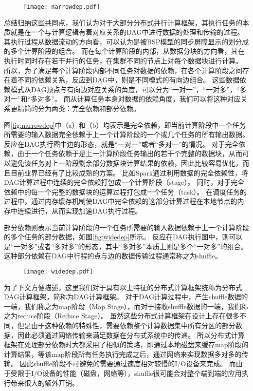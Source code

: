 \begin{figure}[!htp]
    \centering
    \texttt{[image: narrowdep.pdf]}
\end{figure}

总结归纳这些共同点，我们认为对于大部分分布式并行计算框架，其执行任务的本质就是在一个与计算逻辑有着对应关系的DAG中进行数据的处理和传输的过程。
其执行过程从数据流动的方向看，可以认为是被BSP模型的同步屏障显示的划分成的多个计算阶段的组合。
而在每个计算阶段的内部，从数据分块的方向看，其在执行时同时存在若干并行的任务，在集群不同的节点上对每个数据块进行计算。
所以，为了满足每个计算阶段内部不同任务对数据的依赖，在各个计算阶段之间存在着不同的依赖关系，反应到DAG中，则是不同模式的有向边组合。
这些数据依赖模式从DAG顶点与有向边对应关系的角度，可以分为“一对一”，“一对多”，“多对一”和“多对多”。
而从计算任务本身对数据的依赖角度，我们可以将这种对应关系更精简的分为两类：完全依赖和部分依赖。

图\ref{fig:narrowdep}中（a）和（b）均表示是完全依赖，即当前计算阶段中一个任务所需要的输入数据完全依赖于上一个计算阶段的一个或几个任务的所有输出数据。
反应在DAG执行图中边的形态，就是“一对一”或者“多对一”的情况。
对于完全依赖，由于一个任务依赖于是上一计算阶段任务输出的若干个完整的数据块，从而可以避免该任务对上一阶段剩余部分数据块计算结果的依赖，因此比较容易优化，而且目前业界已经有了比较成熟的方案。
比如Spark通过利用数据的完全依赖性，将DAG计算过程中连续的完全依赖打包成一个计算阶段（stage）。
同时，对于完全依赖中的每一个完整的数据块的运算过程打包成一个任务（task）。
在调度任务的过程中，通过内存缓存机制使DAG中完全依赖的这部分计算过程在本地节点的内存中连续进行，从而实现加速DAG执行过程。

部分依赖则表示当前计算阶段的一个任务所需要的输入数据依赖于上一个计算阶段的多个任务的部分数据，如图\ref{fig:widedep}所示。
反应在DAG执行图中，则可以是“一对多”或者“多对多”的形态，其中“多对多”本质上则是多个“一对多”的组合。
这种部分依赖在DAG中行程的点与边的数据传输过程通常称之为shuffle。

\begin{figure}[!htp]
    \centering
    \texttt{[image: widedep.pdf]}
\end{figure}

为了下文方便描述，这里我们对于具有以上特征的分布式计算框架统称为分布式DAG计算框架，简称为DAG计算框架。
对于DAG计算过程中，产生shuffle数据的一端，我们称之为map阶段（Map Stage），而对于接收shuffle数据的一端，我们称之为reduce阶段（Reduce Stage）。
虽然这些分布式计算框架在设计上存在很多不同，但是由于这种依赖的特殊性，需要依赖整个计算数据集中所有分区的部分数据，因此必须通过网络传输来满足数据在分布式系统中的传递。
所以分布式计算框架在处理部分依赖时大都采用了相似的策略，即通过本地磁盘来缓存map阶段的计算结果，等该map阶段所有任务执行完成之后，通过网络来实现数据多对多的传输。
因此shuffle阶段不可避免的需要通过速度相对较慢的I/O设备来完成。
而由于受限于I/O设备的性能（磁盘，网络等），shuffle很可能会对整个端到端的应用执行带来很大的额外开销。

